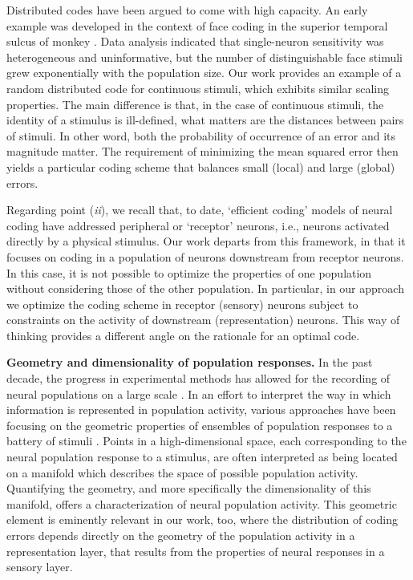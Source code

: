 \documentclass[a4paper]{article}%
\begin{document}
Distributed codes have been argued to come with high capacity. An early
example was developed in the context of face coding in the superior temporal
sulcus of monkey \cite{Abbott1996RepresentationalMonkeys}. Data analysis
indicated that single-neuron sensitivity was heterogeneous and uninformative,
but the number of distinguishable face stimuli grew exponentially with the
population size. Our work provides an example of a random distributed code for
continuous stimuli, which exhibits similar scaling properties. The main
difference is that, in the case of continuous stimuli, the identity of a
stimulus is ill-defined, what matters are the distances between pairs of
stimuli. In other word, both the probability of occurrence of an error and its
magnitude matter. The requirement of minimizing the mean squared error then
yields a particular coding scheme that balances small (local) and large
(global) errors.

Regarding point (\textit{ii}), we recall that, to date, `efficient coding'
models of neural coding have addressed peripheral or `receptor' neurons, i.e.,
neurons activated directly by a physical stimulus. Our work departs from this
framework, in that it focuses on coding in a population of neurons downstream
from receptor neurons. In this case, it is not possible to optimize the
properties of one population without considering those of the other
population. In particular, in our approach we optimize the coding scheme in
receptor (sensory) neurons subject to constraints on the activity of
downstream (representation) neurons. This way of thinking provides a different
angle on the rationale for an optimal code.

\textbf{Geometry and dimensionality of population responses.} In the past
decade, the progress in experimental methods has allowed for the recording of
neural populations on a large scale
\cite{Cunningham2014DimensionalityRecordings,Saxena2019TowardsDoctrine}. In an
effort to interpret the way in which information is represented in population
activity, various approaches have been focusing on the geometric properties of
ensembles of population responses to a battery of stimuli
\cite{Fusi2016WhyCognition,Gallego2017NeuralMovement,Stringer2019HighCortex,Kobak2019State-dependentCortex}%
. Points in a high-dimensional space, each corresponding to the neural
population response to a stimulus, are often interpreted as being located on a
manifold which describes the space of possible population activity.
Quantifying the geometry, and more specifically the dimensionality of this
manifold, offers a characterization of neural population activity. This
geometric element is eminently relevant in our work, too, where the
distribution of coding errors depends directly on the geometry of the
population activity in a representation layer, that results from the
properties of neural responses in a sensory layer. 
\end{document}
